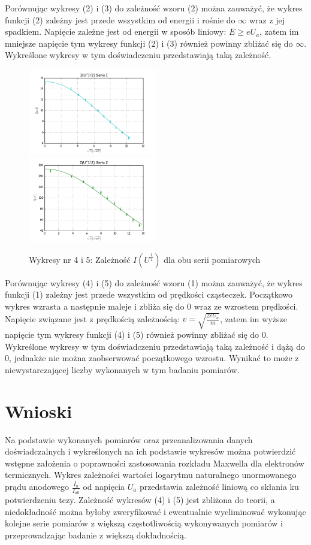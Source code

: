 \documentclass[a4paper,10pt]{article}
\begin{document}
Porównując wykresy (2) i (3) do zależność wzoru (2) można zauważyć, że wykres funkcji (2) zależny jest przede wszystkim od energii i rośnie do $\infty$ wraz z jej spadkiem. Napięcie zależne jest od energii w sposób liniowy: $E \geq eU_a$, zatem im mniejsze napięcie  tym wykresy funkcji (2) i (3) również powinny zbliżać się do $\infty$. Wykreślone wykresy w tym doświadczeniu przedstawiają taką zależność.

\begin{figure}[H]
 \includegraphics[width=0.5\textwidth]{zarzenieU12.png}
 \includegraphics[width=0.5\textwidth]{zarzenieU22.png}
 \caption{Wykresy nr 4 i 5: Zależność $I(U^{\frac{1}{2}})$ dla obu serii pomiarowych}
 \end{figure}

Porównując wykresy (4) i (5) do zależność wzoru (1) można zauważyć, że wykres funkcji (1) zależny jest przede wszystkim od prędkości cząsteczek. Początkowo wykres wzrasta a następnie maleje i zbliża się do 0 wraz ze wzrostem prędkości. Napięcie związane jest z prędkością zależnością: $v = \sqrt{\frac{2eU_a}{m}}$, zatem im wyższe napięcie  tym wykresy funkcji (4) i (5) również powinny zbliżać się do 0. Wykreślone wykresy w tym doświadczeniu przedstawiają taką zależność i dążą do 0, jednakże nie można zaobserwować początkowego wzrostu. Wynikać to może z niewystarczającej liczby wykonanych w tym badaniu pomiarów.

\section{Wnioski}
 Na podstawie wykonanych pomiarów oraz przeanalizowania danych doświadczalnych i wykreślonych na ich podstawie wykresów można potwierdzić wstępne założenia o poprawności zastosowania rozkładu Maxwella dla elektronów termicznych. Wykres zależności wartości logarytmu naturalnego unormowanego prądu anodowego $\frac{I_a}{I_{a0}}$ od napięcia $U_a$ przedstawia zależność liniową co skłania ku potwierdzeniu tezy. Zależność wykresów (4) i (5) jest zbliżona do teorii, a niedokładność można byłoby zweryfikować i ewentualnie wyeliminować wykonując kolejne serie pomiarów z większą częstotliwością wykonywanych pomiarów i przeprowadzając badanie z większą dokładnością.
 
\end{document}
